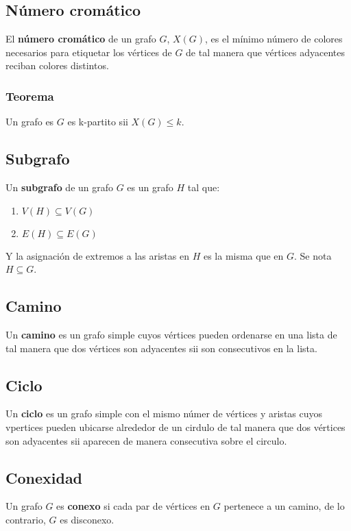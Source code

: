 \documentclass[a4paper]{book}
\begin{document}
\subsection{Número cromático}
El \textbf{número cromático} de un grafo \(G\), \(X\left(G \right)\), es el
mínimo número de colores necesarios para etiquetar los vértices de \(G\) de tal
manera que vértices adyacentes reciban colores distintos.

\subsubsection{Teorema}
Un grafo es \(G\) es k-partito sii  \(X\left(G\right) \le k\).

\subsection{Subgrafo}
Un \textbf{subgrafo} de un grafo \(G\) es un grafo \(H\) tal que:
\begin{enumerate}
    \item \(V\left(H\right)\subseteq V\left(G\right) \)
    \item \(E\left(H\right)\subseteq E\left(G\right)\)
\end{enumerate}
Y la asignación de extremos a las aristas en \(H\) es la misma que en \(G\). Se
nota \(H\subseteq G\).

\subsection{Camino}
Un \textbf{camino} es un grafo simple cuyos vértices pueden ordenarse en una
lista de tal manera que dos vértices son adyacentes sii son consecutivos en la
lista.

\subsection{Ciclo}
Un \textbf{ciclo} es un grafo simple con el mismo númer de vértices y aristas
cuyos vpertices pueden ubicarse alrededor de un cirdulo de tal manera que dos
vértices son adyacentes sii aparecen de manera consecutiva sobre el circulo.

\subsection{Conexidad}
Un grafo \(G\) es \textbf{conexo} si cada par de vértices en \(G\) pertenece a
un camino, de lo contrario, \(G\) es disconexo.
\end{document}
